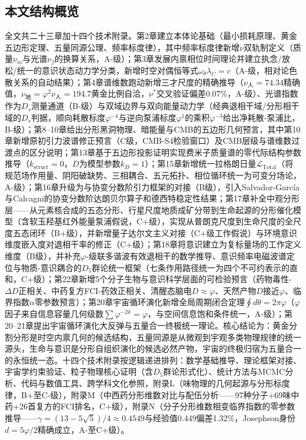 \documentclass[12pt,a4paper,twocolumn]{article}
\renewcommand{\phi}{\varphi}
\begin{document}
\subsection{本文结构概览}
全文共二十三章加十四个技术附录。第2章建立本体论基础（最小损耗原理、黄金五边形定理、五量同源公理、频率标度律），其中频率标度律新增$\nu$双轨制定义（质量$\nu_m$与光谱$\nu_f$的换算关系，A-级）；第3章发展内禀相位时间理论并建立执念/放松/统一的意识状态动力学分类，新增时空对偶恒等式$\omega_\theta\lambda_C=c$（A-级，相对论色散关系的自动结果）；第4章谱维数跑动新增三才尺度的精确推导（$\nu_{\text{人}}=74.34$精确值，$\nu_{\text{地}}=\phi^2\nu_{\text{人}}=194.7$黄金比例自洽，$\nu^*$交叉验证偏差0.07\%，A-级）、光谱指数作为$D_s$测量通道（B-级）与双域边界与双向能量动力学（经典退相干域/分形相干域的$D_s$判据，顺向耗散标度$\phi^{-4}$与逆向泵浦标度$\phi^{1}$的乘积$\phi^{-3}$给出净耗散-泵浦比，B-级）；第8--10章给出分形黑洞物理、暗能量与CMB的五边形几何预言，其中第10章新增原初引力波谱修正预言（C级，CMB-S4检验窗口）及CMB层级与谱维数过渡点的区分说明；第13章基于五边形投影证明实现费米子质量谱的零代际结构参数推导（$k_{\text{struct}}=0$，$D$为模型参数$k_D=1$）；第15章新增统一拉格朗日量$\mathcal{L}_{\text{Total}}$（将规范场作用量、阴阳破缺势、三相耦合、五元拓扑、相位循环统一为可变分场论，A-级）；第16章升级为与协变分数阶引力框架的对接（B级），引入Salvador-Garc\'ia与Calcagni的协变分数阶达朗贝尔算子和德西特稳定性结果；第17章补全中观分形层——从元素核合成的五态分形、行星尺度地质成矿分带到生命起源的分形催化模型（含软玉羟基红外能量泵浦假说，C+级），实现从普朗克尺度到生命尺度的全尺度五态闭环（B+级），并新增量子达尔文主义对接（C+级工作假说）与环境意识维度嵌入度对退相干率的修正（C+级）；第18章将意识建立为复标量场的工作定义维度（B级），并补充$\phi$-级联多谐波有效退相干的数学推导、意识频率电磁波谱定位与物质-意识耦合的$D_5$群论统一框架（七条作用路径统一为四个不可约表示的直和，C+级）；第22章新增5个分子生物与意识科学层面的可检验预言（药物毒性-$\Delta D$正相关、中药复方FCI-药效正相关、清醒态脑电$D\approx\phi$、天然产物$D$接近$\phi$、临界指数$\alpha$零参数预言）；第20章宇宙循环演化新增全局周期闭合定理$\oint d\theta=2\pi\phi$（$\phi$因子来自信息容量几何级数$\sum\phi^{-2k}=\phi$，与空间信息饱和条件统一，A-级）；第20--21章提出宇宙循环演化大反弹与五量合一终极统一理论。核心结论为：黄金分割分形是时空内禀几何的候选结构，五量同源是从微观到宇观多类物理规律的统一源头，生命与意识是分形自组织演化的候选必然产物，宇宙的终极归宿为五量合一的永恒统一态。十四个技术附录按逻辑递进排列：数学基础推导、理论框架对接、宇宙学约束验证、粒子物理核心证明（含$D_5$群论形式化）、统计方法与MCMC分析、代码与数值工具、跨学科文化参照，附录L（味物理的几何起源与分形标度律，B+至C-级），附录M（中西药分形维数对比与配伍分析——97种分子+69味中药+26首复方的FCI排名，C+级），附录N（分子分形维数相变临界指数的零参数推导——$\gamma=(13-5\sqrt{5})/4\approx0.4549$与经验值0.449偏差1.32\%，Josephson身份$d=5\phi/2$精确成立，A-至C+级）。
\end{document}
